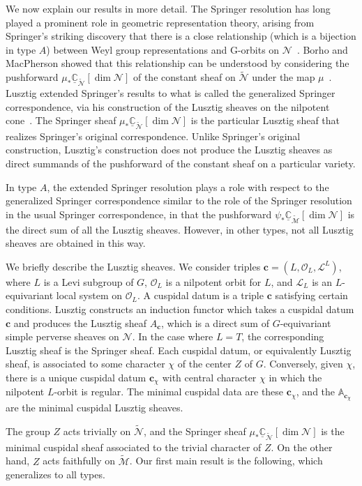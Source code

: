 \documentclass[reqno,11pt]{amsart}
\theoremstyle{remark}
\theoremstyle{remark}
\theoremstyle{definition}
\theoremstyle{definition}
\theoremstyle{definition}
\numberwithin{equation}{section}
\newcommand{\A}{\mathbb{ A}}
\newcommand{\C}{\mathbb{C}}           %
\newcommand{\cl}{\mathcal{L}}
\newcommand{\cm}{\mathcal{M}}
\newcommand{\cn}{\mathcal{N}}
\newcommand{\co}{\mathcal{O}}
\newcommand{\vc}{\mathbf{c}}
\newcommand{\shc}{\underline{\C}}
\renewcommand{\tilde}{\widetilde}
\begin{document}
We now explain our results in more detail.  The Springer resolution has long played a prominent role in geometric representation theory, arising from 
Springer’s striking discovery that there is a close relationship (which is a bijection in type $A$) between Weyl group representations and G-orbits on $\cn$~\cite{Springer1978}.   
Borho and MacPherson showed that this relationship can be understood by considering the pushforward $\mu_* \shc_{\tilde{\cn}}[\dim \cn]$
of the constant sheaf on $\tilde{\cn}$ under the map $\mu$~\cite{Borho1981}.  
Lusztig extended Springer's results to what is called the generalized Springer correspondence, via his construction of the Lusztig sheaves on the 
nilpotent cone~\cite{Lu84}.  The Springer sheaf $\mu_* \shc_{\tilde{\cn}}[\dim \cn]$
is the particular Lusztig sheaf that realizes Springer's original correspondence. 
Unlike Springer's original construction, Lusztig's construction does not produce the Lusztig sheaves as direct summands of the pushforward of the constant sheaf on a particular variety.

In type $A$, the extended Springer resolution plays a role with respect to the generalized Springer
correspondence similar to the role of the Springer resolution in the usual Springer correspondence, in that the pushforward $\psi_* \shc_{\tilde{\cm}}[\dim \cn]$
is the direct sum of all the Lusztig sheaves.  However, in other types, not all Lusztig sheaves are obtained in this way.

We briefly describe the Lusztig sheaves.  We consider triples $\vc = (L, \co_L, \cl^L)$, where $L$ is a Levi subgroup of $G$,
$\co_L$ is a nilpotent orbit for $L$, and $\cl_L$ is an $L$-equivariant local system on $\co_L$.  A cuspidal datum is a triple $\vc$
satisfying certain conditions.  Lusztig constructs an induction functor which takes a cuspidal datum $\vc$ and produces the Lusztig sheaf
$A_{\vc}$, which is a direct sum of $G$-equivariant simple perverse sheaves on $\cn$.
In the case where $L = T$, the corresponding Lusztig sheaf is the Springer sheaf.  Each cuspidal datum, or equivalently Lusztig sheaf,
is associated to some character $\chi$ of the center $Z$ of $G$.  Conversely, given $\chi$, there
is a unique cuspidal datum $\vc_{\chi}$ with central character $\chi$ in which
the nilpotent $L$-orbit is regular.  The minimal cuspidal data are these $\vc_{\chi}$, and the 
$\A_{\vc_{\chi}}$ are the minimal cuspidal Lusztig sheaves.

The group $Z$ acts trivially on 
$\tilde{\cn}$, and the Springer sheaf $\mu_* \shc_{\tilde{\cn}}[\dim \cn]$
 is the minimal cuspidal sheaf associated to the trivial character of $Z$.  
On the other hand, $Z$ acts faithfully on $\tilde{\cm}$.
Our first main result is the following, which generalizes \cite[Theorem~5.3]{GPR23} to all types.
\end{document}
